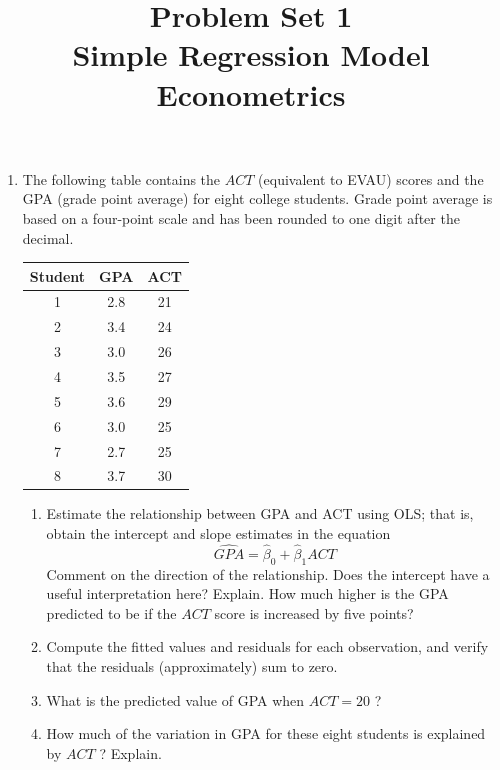 \documentclass[12pt]{article}
\author{\empty}
\title{Problem Set 1\\Simple Regression Model\\Econometrics}
\date{\empty}
\begin{document}
	\maketitle
	
\begin{enumerate}
	
\item The following table contains the $A C T$ (equivalent to EVAU) scores and the GPA (grade point average) for eight college students. Grade point average is based on a four-point scale and has been rounded to one digit after the decimal.

\begin{center}

\begin{tabular}{|ccc|}
\hline Student & GPA & ACT \\
\hline 1 & 2.8 & 21 \\
2 & 3.4 & 24 \\
3 & 3.0 & 26 \\
4 & 3.5 & 27 \\
5 & 3.6 & 29 \\
6 & 3.0 & 25 \\
7 & 2.7 & 25 \\
8 & 3.7 & 30 \\
\hline
\end{tabular}
    
\end{center}

\begin{enumerate}
    \item Estimate the relationship between GPA and ACT using OLS; that is, obtain the intercept and slope estimates in the equation
$$
\widehat{G P A}=\hat{\beta}_0+\hat{\beta}_1 A C T
$$
Comment on the direction of the relationship. Does the intercept have a useful interpretation here? Explain. How much higher is the GPA predicted to be if the $A C T$ score is increased by five points?

\item Compute the fitted values and residuals for each observation, and verify that the residuals (approximately) sum to zero.

\item What is the predicted value of GPA when $A C T=20$ ?

\item How much of the variation in GPA for these eight students is explained by $A C T$ ? Explain.
\end{enumerate}


\end{enumerate}
\end{document}

